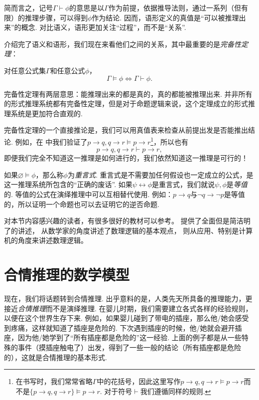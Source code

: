 简而言之，记号$\Gamma\vdash\phi$的意思是以$\Gamma$作为前提，依据推导法则，通过一系列（但有限）的推理步骤，可以得到$\phi$作为结论. 因而，语形定义的真值是“可以被推理出来”的概念. 对比语义，语形更加关注“过程”，而不是“关系”.

介绍完了语义和语形，我们现在来看他们之间的关系，其中最重要的是\textit{完备性定理}：
\begin{theorem}[完备性定理]
对任意公式集$\Gamma$和任意公式$\phi$，
\[\Gamma\vDash\phi\iff\Gamma\vdash\phi.\]
\end{theorem}

完备性定理有两层意思：能推理出来的都是真的，真的都能被推理出来. 并非所有的形式推理系统都有完备性定理，但是对于命题逻辑来说，这个定理成立的形式推理系统是更加符合直观的. 

完备性定理的一个直接推论是，我们可以用真值表来检查从前提出发是否能推出结论. 例如，在 中我们验证了$p\to q,q\to r\vDash p\to r$\footnote{在书写时，我们常常省略$\Gamma$中的花括号，因此这里写作$p\to q,q\to r\vDash p\to r$而不是$\{p\to q,q\to r\}\vDash p\to r$. 对于符号$\vdash$我们遵循同样的规则.}，所以也有
\[p\to q,q\to r\vdash p\to r,\]
即便我们完全不知道这一推理是如何进行的，我们依然知道这一推理是可行的！

如果$\varnothing\vDash \phi$，那么称$\phi$为\textit{重言式}. 重言式是不需要加任何假设也一定成立的公式，是这一推理系统所包含的“正确的废话”. 如果$\psi\leftrightarrow\phi$是重言式，我们就说$\psi,\phi$是\textit{等值}的. 等值的公式在演绎推理中可以互相替代使用. 例如：$p\to q$与$\neg q\to\neg p$是等值的，所以证明一个命题也可以去证明它的逆否命题.

\begin{remark}
    对本节内容感兴趣的读者，有很多很好的教材可以参考。\cite{vandalenLogicStructure2013a} 提供了全面但是简洁明了的讲述，\cite{hamiltonLogicMathematicians1988} 从数学家的角度讲述了数理逻辑的基本观点，\cite{nerodeLogicApplications1997} 则从应用、特别是计算机的角度来讲述数理逻辑。
\end{remark}

\section{合情推理的数学模型}

现在，我们将话题转到合情推理. 出乎意料的是，人类先天所具备的推理能力，更接近\textit{合情推理}而不是演绎推理. 在婴儿时期，我们需要建立各式各样的经验规则，以便在这个世界生存下来. 例如，如果婴儿碰到了带电的插座，那么他/她会感受到疼痛，这样就知道了插座是危险的. 下次遇到插座的时候，他/她就会避开插座，因为他/她学到了“所有插座都是危险的”这一经验. 上面的例子都是从一些特殊的事件（摸插座触电了）出发，得到了一些一般的结论（所有插座都是危险的），这就是合情推理的基本形式.

